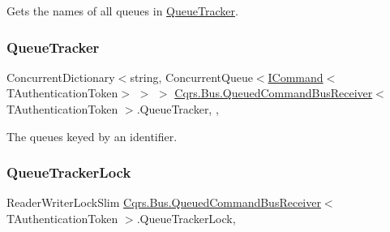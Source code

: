 Gets the names of all queues in \hyperlink{classCqrs_1_1Bus_1_1QueuedCommandBusReceiver_a2fc62989429929acd8ea66808a8c4a78_a2fc62989429929acd8ea66808a8c4a78}{Queue\+Tracker}. 

\mbox{\label{classCqrs_1_1Bus_1_1QueuedCommandBusReceiver_a2fc62989429929acd8ea66808a8c4a78_a2fc62989429929acd8ea66808a8c4a78}} 
\subsubsection{\texorpdfstring{Queue\+Tracker}{QueueTracker}}
{\footnotesize\ttfamily Concurrent\+Dictionary$<$string, Concurrent\+Queue$<$\hyperlink{interfaceCqrs_1_1Commands_1_1ICommand}{I\+Command}$<$T\+Authentication\+Token$>$ $>$ $>$ \hyperlink{classCqrs_1_1Bus_1_1QueuedCommandBusReceiver}{Cqrs.\+Bus.\+Queued\+Command\+Bus\+Receiver}$<$ T\+Authentication\+Token $>$.Queue\+Tracker\hspace{0.3cm}{\ttfamily [static]}, {\ttfamily [get]}, {\ttfamily [protected]}}



The queues keyed by an identifier. 

\mbox{\label{classCqrs_1_1Bus_1_1QueuedCommandBusReceiver_ac633e2d140fc90fab100acba4afa136b_ac633e2d140fc90fab100acba4afa136b}} 
\subsubsection{\texorpdfstring{Queue\+Tracker\+Lock}{QueueTrackerLock}}
{\footnotesize\ttfamily Reader\+Writer\+Lock\+Slim \hyperlink{classCqrs_1_1Bus_1_1QueuedCommandBusReceiver}{Cqrs.\+Bus.\+Queued\+Command\+Bus\+Receiver}$<$ T\+Authentication\+Token $>$.Queue\+Tracker\+Lock\hspace{0.3cm}{\ttfamily [get]}, {\ttfamily [protected]}}



